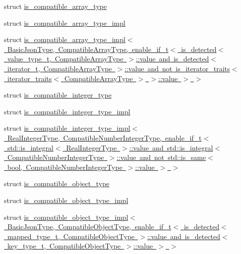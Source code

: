 \begin{DoxyCompactItemize}
\item 
struct \mbox{\hyperlink{structnlohmann_1_1detail_1_1is__compatible__array__type}{is\+\_\+compatible\+\_\+array\+\_\+type}}
\item 
struct \mbox{\hyperlink{structnlohmann_1_1detail_1_1is__compatible__array__type__impl}{is\+\_\+compatible\+\_\+array\+\_\+type\+\_\+impl}}
\item 
struct \mbox{\hyperlink{structnlohmann_1_1detail_1_1is__compatible__array__type__impl_3_01BasicJsonType_00_01CompatibleA2ae7cc020294dfcc2b3bca5a9db30ddf}{is\+\_\+compatible\+\_\+array\+\_\+type\+\_\+impl$<$ Basic\+Json\+Type, Compatible\+Array\+Type, enable\+\_\+if\+\_\+t$<$ is\+\_\+detected$<$ value\+\_\+type\+\_\+t, Compatible\+Array\+Type $>$\+::value and is\+\_\+detected$<$ iterator\+\_\+t, Compatible\+Array\+Type $>$\+::value and not is\+\_\+iterator\+\_\+traits$<$ iterator\+\_\+traits$<$ Compatible\+Array\+Type $>$ $>$\+::value $>$ $>$}}
\item 
struct \mbox{\hyperlink{structnlohmann_1_1detail_1_1is__compatible__integer__type}{is\+\_\+compatible\+\_\+integer\+\_\+type}}
\item 
struct \mbox{\hyperlink{structnlohmann_1_1detail_1_1is__compatible__integer__type__impl}{is\+\_\+compatible\+\_\+integer\+\_\+type\+\_\+impl}}
\item 
struct \mbox{\hyperlink{structnlohmann_1_1detail_1_1is__compatible__integer__type__impl_3_01RealIntegerType_00_01Compati3a04243716e8bda67d1ff2aead18da88}{is\+\_\+compatible\+\_\+integer\+\_\+type\+\_\+impl$<$ Real\+Integer\+Type, Compatible\+Number\+Integer\+Type, enable\+\_\+if\+\_\+t$<$ std\+::is\+\_\+integral$<$ Real\+Integer\+Type $>$\+::value and std\+::is\+\_\+integral$<$ Compatible\+Number\+Integer\+Type $>$\+::value and not std\+::is\+\_\+same$<$ bool, Compatible\+Number\+Integer\+Type $>$\+::value $>$ $>$}}
\item 
struct \mbox{\hyperlink{structnlohmann_1_1detail_1_1is__compatible__object__type}{is\+\_\+compatible\+\_\+object\+\_\+type}}
\item 
struct \mbox{\hyperlink{structnlohmann_1_1detail_1_1is__compatible__object__type__impl}{is\+\_\+compatible\+\_\+object\+\_\+type\+\_\+impl}}
\item 
struct \mbox{\hyperlink{structnlohmann_1_1detail_1_1is__compatible__object__type__impl_3_01BasicJsonType_00_01Compatible0bd988932da161d60568f9b7198a50d2}{is\+\_\+compatible\+\_\+object\+\_\+type\+\_\+impl$<$ Basic\+Json\+Type, Compatible\+Object\+Type, enable\+\_\+if\+\_\+t$<$ is\+\_\+detected$<$ mapped\+\_\+type\+\_\+t, Compatible\+Object\+Type $>$\+::value and is\+\_\+detected$<$ key\+\_\+type\+\_\+t, Compatible\+Object\+Type $>$\+::value $>$ $>$}}

\end{DoxyCompactItemize}

